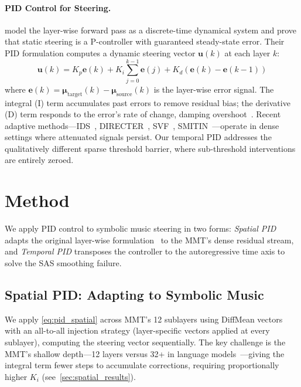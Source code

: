 \documentclass{article}
\theoremstyle{plain}
\begin{document}
\paragraph{PID Control for Steering.}
\citet{nguyen2026pid} model the layer-wise forward pass as a discrete-time dynamical system and prove that static steering is a P-controller with guaranteed steady-state error. Their PID formulation computes a dynamic steering vector $\mathbf{u}(k)$ at each layer $k$:
\begin{equation}
    \mathbf{u}(k) = K_p \mathbf{e}(k) + K_i \textstyle\sum_{j=0}^{k-1}\mathbf{e}(j) + K_d (\mathbf{e}(k) - \mathbf{e}(k{-}1))
    \label{eq:pid_spatial}
\end{equation}
where $\mathbf{e}(k) = \boldsymbol{\mu}_\text{target}(k) - \boldsymbol{\mu}_\text{source}(k)$ is the layer-wise error signal. The integral (I) term accumulates past errors to remove residual bias; the derivative (D) term responds to the error's rate of change, damping overshoot~\cite{astrom1995pid}. Recent adaptive methods---IDS~\cite{vogels2025ids}, DIRECTER~\cite{kang2026directer}, SVF~\cite{li2026svf}, SMITIN~\cite{luo2025smitin}---operate in dense settings where attenuated signals persist. Our temporal PID addresses the qualitatively different sparse threshold barrier, where sub-threshold interventions are entirely zeroed.

\section{Method}
\label{sec:method}

We apply PID control to symbolic music steering in two forms: \emph{Spatial PID} adapts the original layer-wise formulation~\cite{nguyen2026pid} to the MMT's dense residual stream, and \emph{Temporal PID} transposes the controller to the autoregressive time axis to solve the SAS smoothing failure.

\subsection{Spatial PID: Adapting to Symbolic Music}
\label{sec:spatial_method}

We apply \cref{eq:pid_spatial} across MMT's 12 sublayers using DiffMean vectors with an all-to-all injection strategy (layer-specific vectors applied at every sublayer), computing the steering vector sequentially. The key challenge is the MMT's shallow depth---12 layers versus 32+ in language models~\cite{nguyen2026pid}---giving the integral term fewer steps to accumulate corrections, requiring proportionally higher $K_i$ (see~\cref{sec:spatial_results}).
\end{document}
